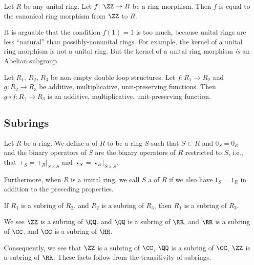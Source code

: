 \begin{theorem}
Let $R$ be any unital ring.
Let $f\colon\ZZ\to R$ be a ring morphism.
Then $f$ is equal to the canonical ring morphism from $\ZZ$ to $R$.
\end{theorem}

\begin{remark}
It is arguable that the condition $f(1)=1$ is too much, because unital
rings are less ``natural'' than possibly-nonunital rings. For example,
the kernel of a unital ring morphism is not a unital ring. But the
kernel of a unital ring morphism \emph{is} an Abelian subgroup.
\end{remark}

\begin{theorem}
Let $R_{1}$, $R_{2}$, $R_{3}$ be non empty double loop structures.
Let $f\colon R_{1}\to R_{2}$ and $g\colon R_{2}\to R_{3}$ be additive,
multiplicative, unit-preserving functions. Then $g\circ f\colon R_{1}\to R_{3}$
is an additive, multiplicative, unit-preserving function.
\end{theorem}

\subsection{Subrings}

\begin{definition}[Subrings]
Let $R$ be a ring. We define a  of $R$ to be a ring
$S$ such that $S\subset R$ and $0_{S}=0_{R}$ and the binary operators
of $S$ are the binary operators of $R$ restricted to $S$, i.e., that
$+_{S} = +_{R}|_{S\times S}$ and  $\star_{S} = \star_{R}|_{S\times S}$.

Furthermore, when $R$ is a unital ring, we call $S$ a  
of $R$ if we also have $1_{S}=1_{R}$ in addition to the preceding
properties. 
\end{definition}

\begin{theorem}
If $R_{1}$ is a subring of $R_{2}$, and $R_{2}$ is a subring of
$R_{3}$, then $R_{1}$ is a subring of $R_{3}$.
\end{theorem}

\begin{example}
We see $\ZZ$ is a subring of $\QQ$, and $\QQ$ is a subring of $\RR$,
and $\RR$ is a subring of $\CC$,
and $\CC$ is a subring of $\HH$.

Consequently, we see that $\ZZ$ is a subring of $\CC$, $\QQ$ is a
subring of $\CC$, $\ZZ$ is a subring of $\RR$. These facts follow from
the transitivity of subrings.
\end{example}

